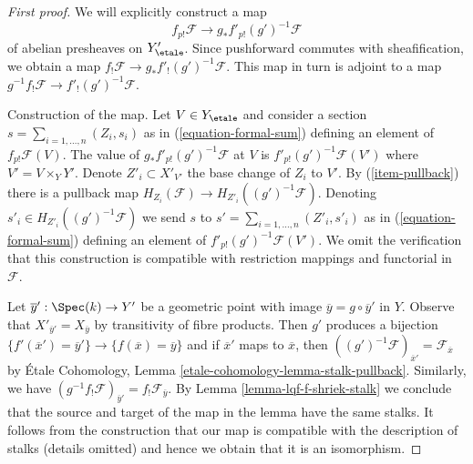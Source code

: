 \begin{proof}[First proof]
We will explicitly construct a map
$$
f_{p!}\mathcal{F} \longrightarrow g_*f'_{p!}(g')^{-1}\mathcal{F}
$$
of abelian presheaves on $Y'_\etale$. Since pushforward commutes
with sheafification, we obtain a map
$f_!\mathcal{F} \to g_*f'_!(g')^{-1}\mathcal{F}$.
This map in turn is adjoint to a map
$g^{-1}f_!\mathcal{F} \to f'_!(g')^{-1}\mathcal{F}$.

\medskip\noindent
Construction of the map. Let $V \in Y_\etale$ and consider a section
$s = \sum_{i = 1, \ldots, n} (Z_i, s_i)$ as in
(\ref{equation-formal-sum}) defining an element of $f_{p!}\mathcal{F}(V)$.
The value of $g_*f'_{p!}(g')^{-1}\mathcal{F}$ at $V$ is
$f'_{p!}(g')^{-1}\mathcal{F}(V')$ where $V' = V \times_Y Y'$.
Denote $Z'_i \subset X'_{V'}$ the base change of $Z_i$ to $V'$.
By (\ref{item-pullback}) there is a pullback map
$H_{Z_i}(\mathcal{F}) \to H_{Z'_i}((g')^{-1}\mathcal{F})$.
Denoting $s'_i \in H_{Z'_i}((g')^{-1}\mathcal{F})$ we send
$s$ to $s' = \sum_{i = 1, \ldots, n} (Z'_i, s'_i)$ as in
(\ref{equation-formal-sum}) defining an element of
$f'_{p!}(g')^{-1}\mathcal{F}(V')$. We omit the verification
that this construction is compatible with restriction
mappings and functorial in $\mathcal{F}$.

\medskip\noindent
Let $\overline{y}' : \Spec(k) \to Y'$ be a geometric point with image
$\overline{y} = g \circ \overline{y}'$ in $Y$. Observe that
$X'_{\overline{y}'} = X_{\overline{y}}$ by transitivity of
fibre products. Then $g'$ produces a bijection
$\{f'(\overline{x}') = \overline{y}'\} \to \{f(\overline{x}) = \overline{y}\}$
and if $\overline{x}'$ maps to $\overline{x}$, then
$((g')^{-1}\mathcal{F})_{\overline{x}'} = \mathcal{F}_{\overline{x}}$
by \'Etale Cohomology, Lemma \ref{etale-cohomology-lemma-stalk-pullback}.
Similarly, we have
$(g^{-1}f_!\mathcal{F})_{\overline{y}'} = f_!\mathcal{F}_{\overline{y}}$.
By Lemma \ref{lemma-lqf-f-shriek-stalk} we conclude that
the source and target of the map in the lemma have the same
stalks. It follows from the construction that our map is
compatible with the description of stalks (details omitted)
and hence we obtain that it is an isomorphism.
\end{proof}

